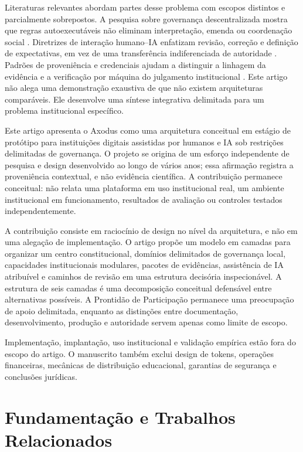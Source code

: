 \documentclass[11pt]{article}
\begin{document}
Literaturas relevantes abordam partes desse problema com escopos distintos e
parcialmente sobrepostos. A pesquisa sobre governança descentralizada mostra
que regras autoexecutáveis não eliminam interpretação, emenda ou coordenação
social \citep{hassan2021dao,hsieh2018bitcoin}. Diretrizes de interação
humano--IA enfatizam revisão, correção e definição de expectativas, em vez de
uma transferência indiferenciada de autoridade
\citep{amershi2019guidelines}. Padrões de proveniência e credenciais ajudam a
distinguir a linhagem da evidência e a verificação por máquina do julgamento
institucional \citep{w3c2013provdm,w3c2025vcdm}. Este artigo não alega uma
demonstração exaustiva de que não existem arquiteturas comparáveis. Ele
desenvolve uma síntese integrativa delimitada para um problema institucional
específico.

Este artigo apresenta o Axodus como uma arquitetura conceitual em estágio de
protótipo para instituições digitais assistidas por humanos e IA sob
restrições delimitadas de governança. O projeto se origina de um esforço
independente de pesquisa e design desenvolvido ao longo de vários anos; essa
afirmação registra a proveniência contextual, e não evidência científica. A
contribuição permanece conceitual: não relata uma plataforma em uso
institucional real, um ambiente institucional em funcionamento, resultados de
avaliação ou controles testados independentemente.

A contribuição consiste em raciocínio de design no nível da arquitetura, e
não em uma alegação de implementação. O artigo propõe um modelo em camadas
para organizar um centro constitucional, domínios delimitados de governança
local, capacidades institucionais modulares, pacotes de evidências,
assistência de IA atribuível e caminhos de revisão em uma estrutura decisória
inspecionável. A estrutura de seis camadas é uma decomposição conceitual
defensável entre alternativas possíveis. A Prontidão de Participação permanece
uma preocupação de apoio delimitada, enquanto as distinções entre
documentação, desenvolvimento, produção e autoridade servem apenas como
limite de escopo.

Implementação, implantação, uso institucional e validação empírica estão fora
do escopo do artigo. O manuscrito também exclui design de tokens, operações
financeiras, mecânicas de distribuição educacional, garantias de segurança e
conclusões jurídicas.

\section{Fundamentação e Trabalhos Relacionados}
\end{document}
